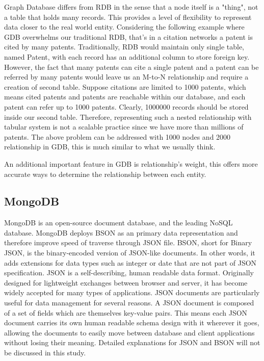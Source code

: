 \documentclass{sig-alternate}
\begin{document}
{Graph Database differs from RDB in the sense that a node itself is a "thing", not a table that holds many records. This provides a level of flexibility to represent data closer to the real world entity. Considering the following example where GDB overwhelms our traditional RDB, that's in a citation networks a patent is cited by many patents. Traditionally, RDB would maintain only single table, named Patent, with each record has an additional column to store foreign key. However, the fact that many patents can cite a single patent and a patent can be referred by many patents would leave us an M-to-N relationship and require a creation of second table. Suppose citations are limited to 1000 patents, which means cited patents and patents are reachable within our database, and each patent can refer up to 1000 patents. Clearly, 1000000 records should be stored inside our second table. Therefore, representing such a nested relationship with tabular system is not a scalable practice since we have more than millions of patents. The above problem can be addressed with 1000 nodes and 2000 relationship in GDB, this is much similar to what we usually think.

An additional important feature in GDB is relationship's weight, this offers more accurate ways to determine the relationship between each entity. 

\subsection{MongoDB}
MongoDB  is an open-source document database, and the leading NoSQL database. MongoDB deploys BSON as an primary data representation and therefore improve speed of traverse through JSON file. BSON, short for Binary JSON, is the binary-encoded version of JSON-like documents. In other words, it adds extensions for data types such as integer or date that are not part of JSON specification. JSON is a self-describing, human readable data format. Originally designed for lightweight exchanges between browser and server, it has become widely accepted for many types of applications. JSON documents are particularly useful for data management for several reasons. A JSON document is composed of a set of fields which are themselves key-value pairs. This means each JSON document carries its own human readable schema design with it wherever it goes, allowing the documents to easily move between database and client applications without losing their meaning. Detailed explanations for JSON and BSON will not be discussed in this study.

}
\end{document}
